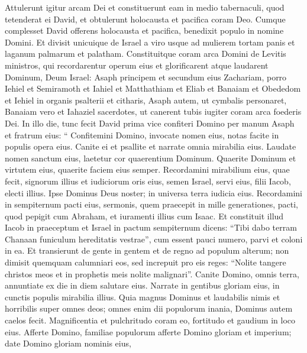 \begin{biblechapter}
\begin{biblechapter}
\begin{biblechapter}
\begin{biblechapter}
\begin{biblechapter}
\begin{biblechapter}
\begin{biblechapter}
\begin{biblechapter}
\begin{biblechapter}
\begin{biblechapter}
\begin{biblechapter}
\begin{biblechapter}
\begin{biblechapter}
\begin{biblechapter}
\begin{biblechapter}
\begin{biblechapter}
\verse Attulerunt igitur arcam Dei et constituerunt eam in medio tabernaculi, quod tetenderat ei David, et obtulerunt holocausta et pacifica coram Deo. 
\verse Cumque complesset David offerens holocausta et pacifica, benedixit populo in nomine Domini. 
\verse Et divisit unicuique de Israel a viro usque ad mulierem tortam panis et laganum palmarum et palatham.
 \verse Constituitque coram arca Domini de Levitis ministros, qui recordarentur operum eius et glorificarent atque laudarent Dominum, Deum Israel: 
\verse Asaph principem et secundum eius Zachariam, porro Iehiel et Semiramoth et Iahiel et Matthathiam et Eliab et Banaiam et Obededom et Iehiel in organis psalterii et citharis, Asaph autem, ut cymbalis personaret, 
\verse Banaiam vero et Iahaziel sacerdotes, ut canerent tubis iugiter coram arca foederis Dei.
 \verse In illo die, tunc fecit David prima vice confiteri Domino per manum Asaph et fratrum eius:
 \verse “ Confitemini Domino, invocate nomen eius,
 notas facite in populis opera eius.
 \verse Canite ei et psallite
 et narrate omnia mirabilia eius.
 \verse Laudate nomen sanctum eius,
 laetetur cor quaerentium Dominum.
 \verse Quaerite Dominum et virtutem eius,
 quaerite faciem eius semper.
 \verse Recordamini mirabilium eius, quae fecit,
 signorum illius et iudiciorum oris eius,
 \verse semen Israel, servi eius,
 filii Iacob, electi illius.
 \verse Ipse Dominus Deus noster;
 in universa terra iudicia eius.
 \verse Recordamini in sempiternum pacti eius,
 sermonis, quem praecepit in mille generationes,
 \verse pacti, quod pepigit cum Abraham,
 et iuramenti illius cum Isaac.
 \verse Et constituit illud Iacob in praeceptum
 et Israel in pactum sempiternum
 \verse dicens: “Tibi dabo terram Chanaan
 funiculum hereditatis vestrae”,
 \verse cum essent pauci numero,
 parvi et coloni in ea.
 \verse Et transierunt de gente in gentem
 et de regno ad populum alterum;
 \verse non dimisit quemquam calumniari eos,
 sed increpuit pro eis reges:
 \verse “Nolite tangere christos meos
 et in prophetis meis nolite malignari”.
 \verse Canite Domino, omnis terra,
 annuntiate ex die in diem salutare eius.
 \verse Narrate in gentibus gloriam eius,
 in cunctis populis mirabilia illius.
 \verse Quia magnus Dominus et laudabilis nimis
 et horribilis super omnes deos;
 \verse omnes enim dii populorum inania,
 Dominus autem caelos fecit.
 \verse Magnificentia et pulchritudo coram eo,
 fortitudo et gaudium in loco eius.
 \verse Afferte Domino, familiae populorum
 afferte Domino gloriam et imperium;
 \verse date Domino gloriam nominis eius,

\end{biblechapter}
\end{biblechapter}
\end{biblechapter}
\end{biblechapter}
\end{biblechapter}
\end{biblechapter}
\end{biblechapter}
\end{biblechapter}
\end{biblechapter}
\end{biblechapter}
\end{biblechapter}
\end{biblechapter}
\end{biblechapter}
\end{biblechapter}
\end{biblechapter}
\end{biblechapter}
